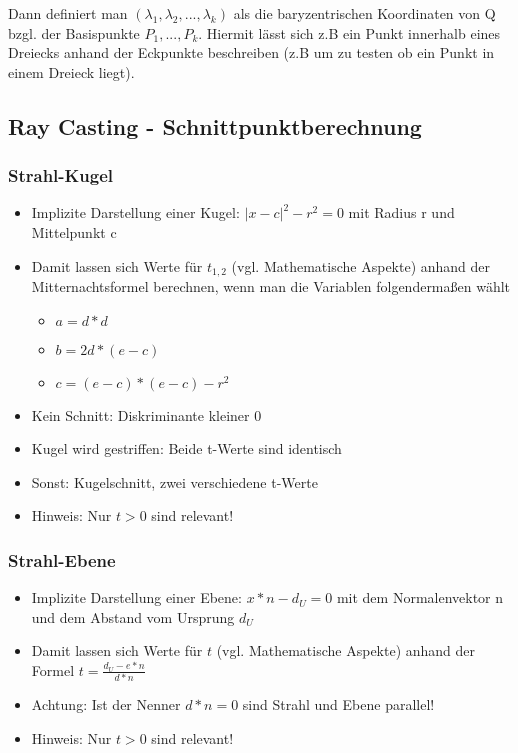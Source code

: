 \documentclass[10pt,a4paper]{article}
\begin{document}
		Dann definiert man $(\lambda_1, \lambda_2, ..., \lambda_k)$ als die baryzentrischen Koordinaten von Q bzgl. der Basispunkte $P_1, ..., P_k$. Hiermit lässt sich z.B ein Punkt innerhalb eines Dreiecks anhand der Eckpunkte beschreiben (z.B um zu testen ob ein Punkt in einem Dreieck liegt).

	\newpage
	\subsection{Ray Casting - Schnittpunktberechnung}
	\subsubsection{Strahl-Kugel}
		\begin{itemize}
			\item Implizite Darstellung einer Kugel: $|x - c|^2 - r^2 = 0$ mit Radius r und Mittelpunkt c
			\item Damit lassen sich Werte für $t_{1,2}$ (vgl. Mathematische Aspekte) anhand der Mitternachtsformel berechnen, wenn man die Variablen folgendermaßen wählt
			\begin{itemize}
				\item $a = d * d$
				\item $b = 2d * (e - c)$
				\item $c = (e - c) * (e - c) - r^2$
			\end{itemize}
			\item Kein Schnitt: Diskriminante kleiner 0
			\item Kugel wird gestriffen: Beide t-Werte sind identisch
			\item Sonst: Kugelschnitt, zwei verschiedene t-Werte
			\item Hinweis: Nur $t > 0$ sind relevant!
		\end{itemize}

	\subsubsection{Strahl-Ebene}
		\begin{itemize}
			\item Implizite Darstellung einer Ebene: $x * n - d_U = 0$ mit dem Normalenvektor n und dem Abstand vom Ursprung $d_U$
			\item Damit lassen sich Werte für $t$ (vgl. Mathematische Aspekte) anhand der Formel $t = \frac{d_U - e * n}{d * n}$
			\item Achtung: Ist der Nenner $d * n = 0$ sind Strahl und Ebene parallel!
			\item Hinweis: Nur $t > 0$ sind relevant!
		\end{itemize}
\end{document}
